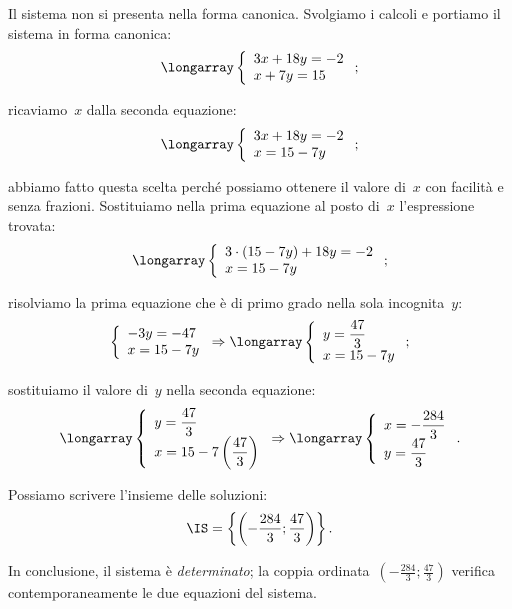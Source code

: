 \begin{exrig}
\begin{esempio}
\begin{enumeratea}
 \item Il sistema non si presenta nella forma canonica. Svolgiamo i calcoli e portiamo il sistema in forma canonica:
\[\longarray\left\{\begin{array}{l}3x+18y=-2\\x+7y=15\end{array}\right.;\]
\item ricaviamo~$x$ dalla seconda equazione:
\[\longarray\left\{\begin{array}{l}3x+18y=-2\\x=15-7y\end{array}\right.;\]
\item abbiamo fatto questa scelta perché possiamo ottenere il valore di~$x$
con facilità e senza frazioni. Sostituiamo nella prima equazione al posto di~$x$
l'espressione trovata:
\[\longarray\left\{\begin{array}{l}
          3\cdot(15-7y)+18y=-2\\
          x=15-7y
          \end{array}\right.;
\]
\item risolviamo la prima equazione che è di primo grado nella sola
incognita~$y$:
\[\left\{\begin{array}{l}
          -3y=-47\\
          x=15-7y
          \end{array}\right.
\Rightarrow\longarray\left\{\begin{array}{l}
          y=\dfrac{47}{3}\\
          x=15-7y
         \end{array}\right.;\]
\item sostituiamo il valore di~$y$ nella seconda equazione:
\[\longarray\left\{\begin{array}{l}
          y=\dfrac{47}{3}\\
          x=15-7\left(\dfrac{47}{3}\right)
          \end{array}\right.
\Rightarrow \longarray\left\{\begin{array}{l}x=-\dfrac{284}{3}\\
 y=\dfrac{47}{3}\end{array}\right..\]
\end{enumeratea}

Possiamo scrivere l'insieme delle soluzioni:
\[\IS=\left\{\left(-\frac{284}{3};\frac{47}{3}\right)\right\}.\]

In conclusione, il sistema è \emph{determinato}; la coppia
ordinata~$\left(-\frac{284}{3};\frac{47}{3}\right)$ verifica contemporaneamente le due
equazioni del sistema.
 \end{esempio}


\end{exrig}
